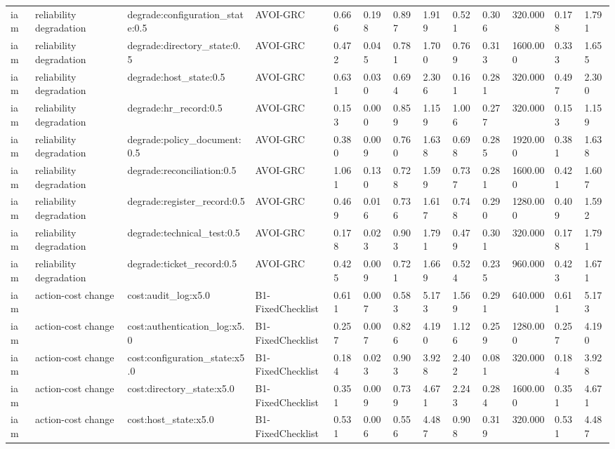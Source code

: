 \begin{table}[!ht]
{\begin{tabular}{lllllllllllll}
iam & reliability degradation & degrade:configuration\_state:0.5 & AVOI-GRC & 0.666 & 0.198 & 0.897 & 1.919 & 0.521 & 0.306 & 320.000 & 0.178 & 1.791 \\
iam & reliability degradation & degrade:directory\_state:0.5 & AVOI-GRC & 0.472 & 0.045 & 0.781 & 1.700 & 0.769 & 0.313 & 1600.000 & 0.333 & 1.655 \\
iam & reliability degradation & degrade:host\_state:0.5 & AVOI-GRC & 0.631 & 0.030 & 0.694 & 2.306 & 0.161 & 0.281 & 320.000 & 0.497 & 2.300 \\
iam & reliability degradation & degrade:hr\_record:0.5 & AVOI-GRC & 0.153 & 0.000 & 0.859 & 1.159 & 1.006 & 0.277 & 320.000 & 0.153 & 1.159 \\
iam & reliability degradation & degrade:policy\_document:0.5 & AVOI-GRC & 0.380 & 0.009 & 0.760 & 1.638 & 0.698 & 0.285 & 1920.000 & 0.381 & 1.638 \\
iam & reliability degradation & degrade:reconciliation:0.5 & AVOI-GRC & 1.061 & 0.130 & 0.728 & 1.599 & 0.737 & 0.281 & 1600.000 & 0.421 & 1.607 \\
iam & reliability degradation & degrade:register\_record:0.5 & AVOI-GRC & 0.469 & 0.016 & 0.736 & 1.617 & 0.748 & 0.290 & 1280.000 & 0.409 & 1.592 \\
iam & reliability degradation & degrade:technical\_test:0.5 & AVOI-GRC & 0.178 & 0.023 & 0.903 & 1.791 & 0.479 & 0.301 & 320.000 & 0.178 & 1.791 \\
iam & reliability degradation & degrade:ticket\_record:0.5 & AVOI-GRC & 0.425 & 0.009 & 0.721 & 1.669 & 0.524 & 0.235 & 960.000 & 0.423 & 1.671 \\
iam & action-cost change & cost:audit\_log:x5.0 & B1-FixedChecklist & 0.611 & 0.007 & 0.583 & 5.173 & 1.569 & 0.291 & 640.000 & 0.611 & 5.173 \\
iam & action-cost change & cost:authentication\_log:x5.0 & B1-FixedChecklist & 0.257 & 0.007 & 0.826 & 4.190 & 1.126 & 0.259 & 1280.000 & 0.257 & 4.190 \\
iam & action-cost change & cost:configuration\_state:x5.0 & B1-FixedChecklist & 0.184 & 0.023 & 0.903 & 3.928 & 2.402 & 0.081 & 320.000 & 0.184 & 3.928 \\
iam & action-cost change & cost:directory\_state:x5.0 & B1-FixedChecklist & 0.351 & 0.009 & 0.739 & 4.671 & 2.243 & 0.284 & 1600.000 & 0.351 & 4.671 \\
iam & action-cost change & cost:host\_state:x5.0 & B1-FixedChecklist & 0.531 & 0.006 & 0.556 & 4.487 & 0.908 & 0.319 & 320.000 & 0.531 & 4.487 \\

\end{tabular}}
\end{table}
